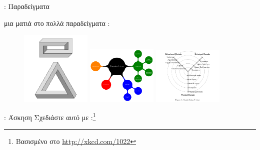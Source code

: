\documentclass{beamer}
\begin{document}
\begin{frame}[fragile]{\insertsection: Παραδείγματα}
\begin{itemize}
 μια ματιά στο \en {} \gr {} πολλά παραδείγματα \en \tikzname{}:
\end{itemize}
\begin{figure}
\href{http://texample.net/tikz/examples/escher-brick-penrose-triangle/}{%
  \includegraphics[width=0.3\textwidth]{escher-brick-penrose-triangle}}
\href{http://texample.net/tikz/examples/computer-science-mindmap/}{%
  \includegraphics[width=0.3\textwidth]{computer-science-mindmap}}
\href{http://texample.net/tikz/examples/gajski-kuhn-y-chart/}{%
  \includegraphics[width=0.3\textwidth]{gajski-kuhn-y-chart}}
\end{figure}
\end{frame}

\begin{frame}[fragile]{\insertsection: Άσκηση}
Σχεδιάστε αυτό με \en \tikzname:\footnote{\gr Βασισμένο στο \en  \url{http://xkcd.com/1022}}
\begin{figure}

\end{figure}
\end{frame}
\gr
\end{document}
